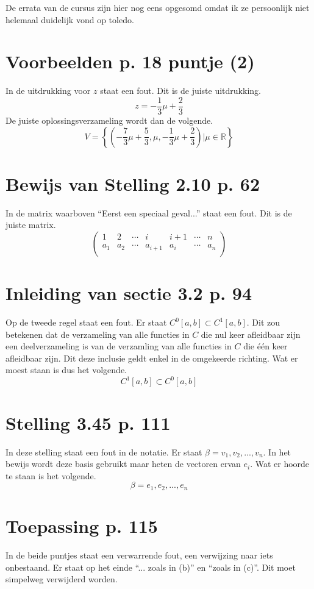 \documentclass[lineaire_algebra_oplossingen.tex]{subfiles}
\begin{document}
\noindent De errata van de cursus zijn hier nog eens opgesomd omdat ik ze persoonlijk niet helemaal duidelijk vond op toledo.

\section{Voorbeelden p. 18 puntje (2)}
In de uitdrukking voor $z$ staat een fout. Dit is de juiste uitdrukking.
\[
z = -\frac{1}{3}\mu + \frac{2}{3}
\]
De juiste oplossingsverzameling wordt dan de volgende.
\[
V = \left\{\left(-\frac{7}{3}\mu+\frac{5}{3},\mu,-\frac{1}{3}\mu + \frac{2}{3}\right) | \mu \in \mathbb{R}\right\}
\]

\section{Bewijs van Stelling 2.10 p. 62}
In de matrix waarboven ``Eerst een speciaal geval...'' staat een fout. Dit is de juiste matrix.
\[
\begin{pmatrix}
1 & 2 & \cdots & i & i+1 & \cdots & n\\
a_1 & a_2 & \cdots & a_{i+1} & a_i & \cdots & a_n\\ 
\end{pmatrix}
\]

\section{Inleiding van sectie 3.2 p. 94}
Op de tweede regel staat een fout. Er staat $C^0[a,b] \subset C^1[a,b]$.
Dit zou betekenen dat de verzameling van alle functies in $C$ die nul keer afleidbaar zijn een deelverzameling is van de verzamling van alle functies in $C$ die \'e\'en keer afleidbaar zijn.
Dit deze inclusie geldt enkel in de omgekeerde richting. Wat er moest staan is dus het volgende.
\[
C^1[a,b] \subset C^0[a,b]
\]

\section{Stelling 3.45 p. 111}
In deze stelling staat een fout in de notatie. Er staat $\beta = v_1,v_2,...,v_n$.
In het bewijs wordt deze basis gebruikt maar heten de vectoren ervan $e_i$.
Wat er hoorde te staan is het volgende.
\[
\beta = e_1,e_2,...,e_n
\]

\section{Toepassing p. 115}
In de beide puntjes staat een verwarrende fout, een verwijzing naar iets onbestaand.
Er staat op het einde ``... zoals in (b)'' en ``zoals in (c)''.
Dit moet simpelweg verwijderd worden.
\end{document}
